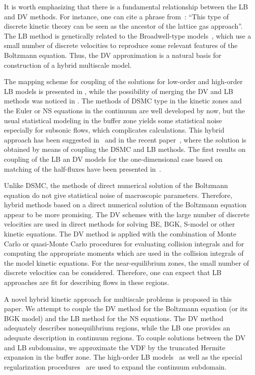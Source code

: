 \documentclass{elsarticle} %
\begin{document}
It is worth emphasizing that there is a fundamental relationship between the LB and DV methods.
For instance, one can cite a phrase from~\cite{Rivet2001}:
``This type of discrete kinetic theory can be seen as the ancestor of the lattice gas approach''.
The LB method is genetically related to the Broadwell-type models~\cite{Broadwell1964shock, Gatignol1975},
which use a small number of discrete velocities to reproduce some relevant features of the Boltzmann equation.
Thus, the DV approximation is a natural basis for construction of a hybrid multiscale model.

The mapping scheme for coupling of the solutions for low-order and high-order LB models is presented in \cite{Meng2011},
while the possibility of merging the DV and LB methods was noticed in \cite{Succi2016}.
The methods of DSMC type in the kinetic zones and the Euler or NS equations in the continuum are well developed by now,
but the usual statistical modeling in the buffer zone yields some statistical noise especially for subsonic flows, which complicates calculations.
This hybrid approach has been suggested in~\cite{Staso2016short, Staso2016long} and in the recent paper~\cite{Staso2018},
where the solution is obtained by means of coupling the DSMC and LB methods.
The first results on coupling of the LB an DV models for the one-dimensional case
based on matching of the half-fluxes have been presented in~\cite{Ilyin2018}.

Unlike DSMC, the methods of direct numerical solution of the Boltzmann equation do not give statistical noise of macroscopic parameters.
Therefore, hybrid methods based on a direct numerical solution of the Boltzmann equation appear to be more promising.
The DV schemes with the large number of discrete velocities are used in direct methods for solving BE, BGK, S-model or other kinetic equations.
The DV method is applied with the combination of Monte Carlo or quasi-Monte Carlo procedures for evaluating collision integrals
and for computing the appropriate moments which are used in the collision integrals of the model kinetic equations.
For the near-equilibrium zones, the small number of discrete velocities can be considered.
Therefore, one can expect that LB approaches are fit for describing flows in these regions.

A novel hybrid kinetic approach for multiscale problems is proposed in this paper.
We attempt to couple the DV method for the Boltzmann equation (or its BGK model) and the LB method for the NS equations.
The DV method adequately describes nonequilibrium regions, while the LB one provides an adequate description in continuum regions.
To couple solutions between the DV and LB subdomains, we approximate the VDF by the truncated Hermite expansion in the buffer zone.
The high-order LB models~\cite{Shan2006, Feuchter2016} as well as the special regularization procedures~\cite{Latt2006, Mont2015}
are used to expand the continuum subdomain.
\end{document}
